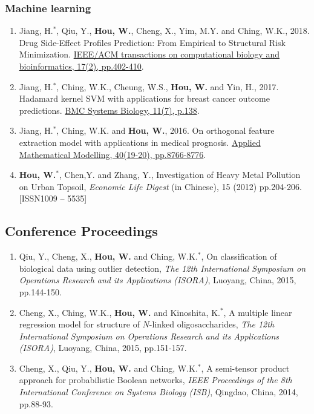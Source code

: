 \documentclass[10pt,letterpaper]{article}
\begin{document}
\subsubsection*{Machine learning}
\begin{enumerate}

\item Jiang, H.$^{\ast}$, Qiu, Y., {\bf Hou, W.}, Cheng, X., Yim, M.Y. and Ching, W.K., 2018. Drug Side-Effect Profiles Prediction: From Empirical to Structural Risk Minimization. \href{https://ieeexplore.ieee.org/abstract/document/8399504}{IEEE/ACM transactions on computational biology and bioinformatics, 17(2), pp.402-410}.

\item Jiang, H.$^{\ast}$, Ching, W.K., Cheung, W.S., {\bf Hou, W.} and Yin, H., 2017. Hadamard kernel SVM with applications for breast cancer outcome predictions. \href{https://bmcsystbiol.biomedcentral.com/articles/10.1186/s12918-017-0514-1}{BMC Systems Biology, 11(7), p.138}.

\item Jiang, H.$^{\ast}$, Ching, W.K. and {\bf Hou, W.}, 2016. On orthogonal feature extraction model with applications in medical prognosis. \href{https://www.sciencedirect.com/science/article/abs/pii/S0307904X1630261X}{Applied Mathematical Modelling, 40(19-20), pp.8766-8776}.

\item {\bf Hou, W.}$^{\ast}$, Chen,Y. and Zhang, Y., Investigation of Heavy Metal Pollution on Urban Topsoil, {\it Economic Life Digest} (in Chinese), 15 (2012) pp.204-206. [ISSN1009 -- 5535]
\end{enumerate}


\subsection*{Conference Proceedings}

\begin{enumerate}
\itemsep 0pt
\item Qiu, Y.,  Cheng, X., \textbf{Hou, W.} and Ching, W.K.$^{\ast}$, On classification of biological data using outlier detection, {\it The 12th International Symposium on Operations Research and its Applications (ISORA)}, Luoyang, China, 2015, pp.144-150.

\item Cheng, X., Ching, W.K., \textbf{Hou, W.} and Kinoshita, K.$^{\ast}$,  A multiple linear regression model for structure of $N$-linked oligosaccharides, {\it The 12th International Symposium on Operations Research and its Applications (ISORA)}, Luoyang, China, 2015, pp.151-157.

\item Cheng, X., Qiu, Y., \textbf{Hou, W.} and Ching, W.K.$^{\ast}$, A semi-tensor product approach for probabilistic Boolean networks, {\it IEEE Proceedings of the 8th International Conference on Systems Biology (ISB)}, Qingdao, China, 2014, pp.88-93.
\end{enumerate}
\end{document}
